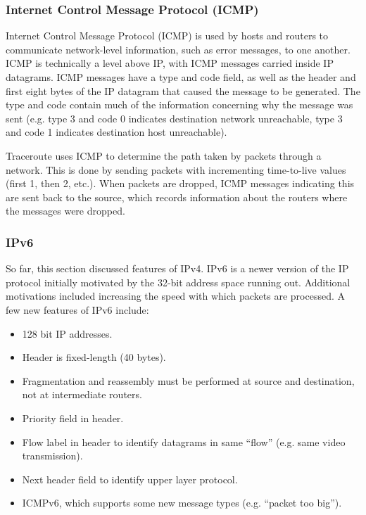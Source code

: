 \documentclass[12pt,titlepage]{article}
\begin{document}
      \subsubsection{Internet Control Message Protocol (ICMP)}
        Internet Control Message Protocol (ICMP) is used by hosts and routers to communicate network-level information, such as error messages, to
        one another. ICMP is technically a level above IP, with ICMP messages carried inside IP datagrams. ICMP messages have a type and code field,
        as well as the header and first eight bytes of the IP datagram that caused the message to be generated. The type and code contain much
        of the information concerning why the message was sent (e.g. type 3 and code 0 indicates destination network unreachable, type 3 and code 1
        indicates destination host unreachable).

        Traceroute uses ICMP to determine the path taken by packets through a network. This is done by sending packets with incrementing time-to-live
        values (first 1, then 2, etc.). When packets are dropped, ICMP messages indicating this are sent back to the source, which records information
        about the routers where the messages were dropped.

      \subsubsection{IPv6}
        So far, this section discussed features of IPv4. IPv6 is a newer version of the IP protocol initially motivated by the 32-bit address space
        running out. Additional motivations included increasing the speed with which packets are processed. A few new features of IPv6 include:
        \begin{itemize}
          \item 128 bit IP addresses.
          \item Header is fixed-length (40 bytes).
          \item Fragmentation and reassembly must be performed at source and destination, not at intermediate routers.
          \item Priority field in header.
          \item Flow label in header to identify datagrams in same ``flow'' (e.g. same video transmission).
          \item Next header field to identify upper layer protocol.
          \item ICMPv6, which supports some new message types (e.g. ``packet too big'').
        \end{itemize}
\end{document}
